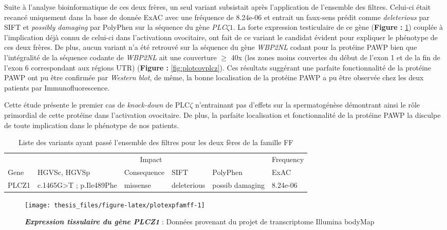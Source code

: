 \documentclass[12pt,twoside]{ugathesis}
\begin{document}
Suite à l'analyse bioinformatique de ces deux frères, un seul variant
subsistait après l'application de l'ensemble des filtres. Celui-ci était
recancé uniquement dans la base de donnée ExAC avec une fréquence de
8.24e-06 et entrait un faux-sens prédit comme \emph{deleterious} par
SIFT et \emph{possibly damaging} par PolyPhen sur la séquence du gène
\emph{PLC}\(\zeta 1\). La forte expression testiculaire de ce gène
(\textbf{Figure : }\ref{fig:plotexpfamff}) couplée à l'implication déjà
connu de celui-ci dans l'activationn ovocitaire, ont fait de ce variant
le candidat évident pour expliquer le phénotype de ces deux frères. De
plus, aucun variant n'a été retrouvé sur la séquence du gène
\emph{WBP2NL} codant pour la protéine PAWP bien que l'intégralité de la
séquence codante de \emph{WBP2NL} ait une couverture \(\ge\) 40x (les
zones moins couvertes du début de l'exon 1 et de la fin de l'exon 6
correspondant aux régions UTR) (\textbf{Figure :
}\ref{fig:plotcovplcz}). Ces résultats suggérant une parfaite
fonctionnalité de la protéine PAWP ont pu être confirmée par
\emph{Western blot}, de même, la bonne localisation de la protéine PAWP
a pu être observée chez les deux patients par Immunofluorescence.

Cette étude présente le premier cas de \emph{knock-down} de PLC\(\zeta\)
n'entrainant pas d'effets sur la spermatogénèse démontrant ainsi le rôle
primordial de cette protéine dans l'activation ovocitaire. De plus, la
parfaite localisation et fonctionnalité de la protéine PAWP la disculpe
de toute implication dans le phénotype de nos patients.

\begin{longtable}[t]{llllll}
\caption{\label{tab:tabrecapff}Liste des variants ayant passé l'ensemble des filtres pour les deux fères de la famille FF}\\
\toprule
\multicolumn{1}{c}{ } & \multicolumn{4}{c}{Impact} & \multicolumn{1}{c}{Frequency} \\
\cmidrule(l{2pt}r{2pt}){2-5} \cmidrule(l{2pt}r{2pt}){6-6}
Gene & HGVSc, HGVSp & Consequence & SIFT & PolyPhen & ExAC\\
\midrule
PLCZ1 & c.1465G>T ; p.Ile489Phe & missense & deleterious & possib damaging & 8.24e-06\\
\bottomrule
\end{longtable}

\newpage

\begin{figure}

{\centering \texttt{[image: thesis\_files/figure-latex/plotexpfamff-1]} 

}

\caption[Expression tissulaire du gène PLCZ1]{\textbf{\emph{Expression tissulaire du gène
\emph{PLCZ1}}} : Données provenant du projet de transcriptome Illumina
bodyMap}\label{fig:plotexpfamff}
\end{figure}
\end{document}
